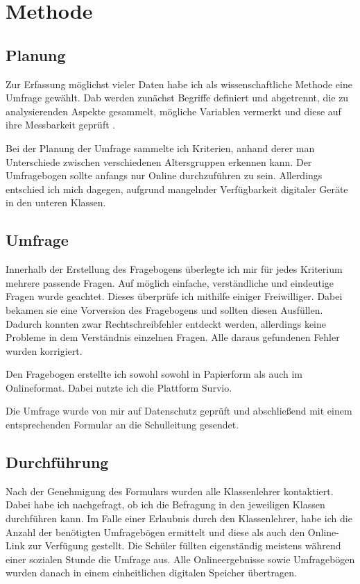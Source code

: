 \section{Methode}

\subsection{Planung}

Zur Erfassung möglichst vieler Daten habe ich als wissenschaftliche Methode eine Umfrage gewählt. Dab werden zunächst Begriffe 
definiert und abgetrennt, die zu analysierenden Aspekte gesammelt, mögliche Variablen vermerkt und diese auf ihre Messbarkeit geprüft
\footnotemark{}.

Bei der Planung der Umfrage sammelte ich Kriterien, anhand derer man Unterschiede zwischen verschiedenen Altersgruppen erkennen kann.
Der Umfragebogen sollte anfangs nur Online durchzuführen zu sein. Allerdings entschied ich mich dagegen, aufgrund mangelnder Verfügbarkeit
digitaler Geräte in den unteren Klassen.

\subsection{Umfrage}

Innerhalb der Erstellung des Fragebogens überlegte ich mir für jedes Kriterium mehrere passende Fragen. Auf möglich einfache, 
verständliche und eindeutige Fragen wurde geachtet. Dieses überprüfe ich mithilfe einiger Freiwilliger. Dabei bekamen sie eine 
Vorversion des Fragebogens und sollten diesen Ausfüllen. Dadurch konnten zwar Rechtschreibfehler entdeckt werden, allerdings keine 
Probleme in dem Verständnis einzelnen Fragen. Alle daraus gefundenen Fehler wurden korrigiert.

Den Fragebogen erstellte ich sowohl sowohl in Papierform als auch im Onlineformat. Dabei nutzte ich die Plattform Survio.

Die Umfrage wurde von mir auf Datenschutz geprüft und abschließend mit einem entsprechenden Formular an die Schulleitung gesendet.

\subsection{Durchführung}

Nach der Genehmigung des Formulars wurden alle Klassenlehrer kontaktiert. Dabei habe ich nachgefragt, ob ich die Befragung in den
jeweiligen Klassen durchführen kann. Im Falle einer Erlaubnis durch den Klassenlehrer, habe ich  die Anzahl der benötigten 
Umfragebögen ermittelt und diese als auch den Online-Link zur Verfügung gestellt. Die Schüler füllten eigenständig meistens während
einer sozialen Stunde die Umfrage aus. Alle Onlineergebnisse sowie Umfragebögen wurden 
danach in einem einheitlichen digitalen Speicher übertragen.